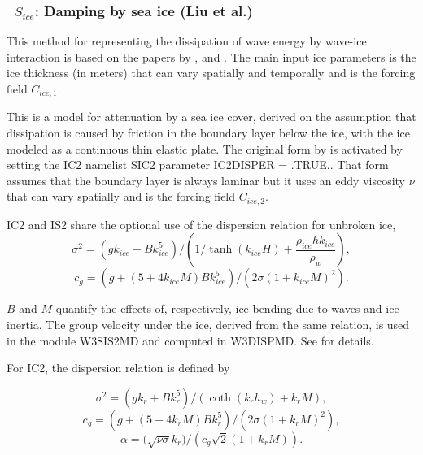 \vsssub
\subsubsection{~$S_{ice}$: Damping by sea ice (Liu et al.)} \label{sec:ICE2}
\vsssub


\noindent
This method for representing the dissipation of wave energy by wave-ice interaction is based on the papers
by \cite{art:LMC88}, \cite{art:LHV91} and \cite{art:Aea15}. The main input ice parameters
is the ice thickness (in meters) that can vary spatially and temporally and is the forcing field  ${C_{ice,1}}$. 

This is a model for attenuation by a
sea ice cover, derived on the assumption that dissipation is caused by
friction in the boundary layer below the ice,
with the ice modeled as a continuous thin elastic plate. The original form by  \cite{art:LMC88} is activated by 
setting the {\code IC2} namelist {\F SIC2} parameter {\code IC2DISPER = .TRUE.}. That form 
 assumes that the boundary layer is always laminar but it uses an eddy viscosity ${\nu}$ that can vary spatially 
and is the forcing field ${C_{ice,2}}$. 

 {\code IC2} and {\code IS2} share 
the optional use of the \cite{art:LMC88} dispersion relation for unbroken ice, 
\begin{equation}
\sigma^2 =  \left(gk_{ice} + B k_{ice}^5\right)  / \left(1/\tanh ( k_{ice}H) +\frac{\rho_{ice}  h k_{ice}} {\rho_{w} }\right),
\end{equation}
\begin{equation}
c_g =  (g+(5 + 4 k_{ice} M)Bk_{ice}^5)/(2\sigma(1+k_{ice}M)^2).
\end{equation}

\noindent
$B$ and $M$ quantify the effects of, respectively, ice bending due to waves and ice inertia. 
The group velocity under the ice, derived from the same relation, is used in the module {\code W3SIS2MD} and computed in  
{\code W3DISPMD}.  See \citet{art:LMC88} for details.

For {\code IC2}, the dispersion relation is defined by 

\begin{equation}\label{eq:ice1}
  {\sigma}^2 = ({gk_r} + {Bk_r^5})/(\coth({k_r}{h_w}) + {k_r}{M}),
\end{equation}
\begin{equation}\label{eq:ice2}
  {c_g} = (g + (5 + 4{k_r}{M}){B}{k_r^5})/(2{\sigma}(1+{k_r}{M})^2),
\end{equation}
\begin{equation}\label{eq:ice3}
  {\alpha} = (\sqrt{{\nu\sigma}}{k_r)}/({c_g}\sqrt{2}(1+{k_r}{M})).
\end{equation}

